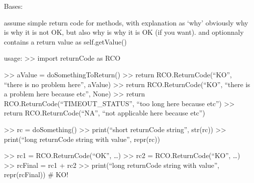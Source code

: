 \documentclass[a4paper,10pt,english]{sphinxmanual}
\begin{document}
\begin{fulllineitems}
\label{\detokenize{apidoc_src/src:src.returnCode.ReturnCode}}
Bases: 

assume simple return code for methods, with explanation as ‘why’
obviously why is why it is not OK, 
but also why is why it is OK (if you want). 
and optionnaly contains a return value as self.getValue()

usage:
\textgreater{}\textgreater{} import returnCode as RCO

\textgreater{}\textgreater{} aValue = doSomethingToReturn()
\textgreater{}\textgreater{} return RCO.ReturnCode(“KO”, “there is no problem here”, aValue)
\textgreater{}\textgreater{} return RCO.ReturnCode(“KO”, “there is a problem here because etc”, None)
\textgreater{}\textgreater{} return RCO.ReturnCode(“TIMEOUT\_STATUS”, “too long here because etc”)
\textgreater{}\textgreater{} return RCO.ReturnCode(“NA”, “not applicable here because etc”)

\textgreater{}\textgreater{} rc = doSomething()
\textgreater{}\textgreater{} print(“short returnCode string”, str(rc))
\textgreater{}\textgreater{} print(“long returnCode string with value”, repr(rc))

\textgreater{}\textgreater{} rc1 = RCO.ReturnCode(“OK”, …)
\textgreater{}\textgreater{} rc2 = RCO.ReturnCode(“KO”, …)
\textgreater{}\textgreater{} rcFinal = rc1 + rc2
\textgreater{}\textgreater{} print(“long returnCode string with value”, repr(rcFinal)) \# KO!

\begin{fulllineitems}
\label{\detokenize{apidoc_src/src:src.returnCode.ReturnCode.KFSYS}}
\end{fulllineitems}


\begin{fulllineitems}
\label{\detokenize{apidoc_src/src:src.returnCode.ReturnCode.KNOWNFAILURE_STATUS}}
\end{fulllineitems}


\end{fulllineitems}
\end{document}
